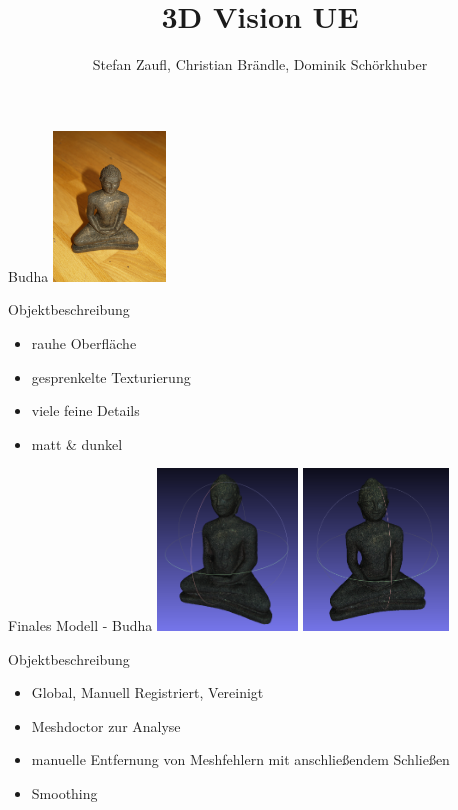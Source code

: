 \documentclass[11pt]{beamer}
\author{Stefan Zaufl, Christian Brändle, Dominik Schörkhuber}
\title{3D Vision UE}
\begin{document}
\begin{frame}
\titlepage
\end{frame}


\begin{frame}{Budha}
\center
	\includegraphics[width=3cm]{images/budha/Budha_original.jpg}
	\begin{block}{Objektbeschreibung}
		\begin{itemize}
			\item rauhe Oberfläche
			\item gesprenkelte Texturierung
			\item viele feine Details
			\item matt \& dunkel
		\end{itemize}
	\end{block}

\end{frame}

\begin{frame}{Finales Modell - Budha}
\center
	\includegraphics[height=4.3cm]{images/budha/Budha_3DScan_Untextured_2.png}
	\includegraphics[height=4.3cm]{images/budha/Budha_3DScan_Untextured.png}
	\begin{block}{Objektbeschreibung}
		\begin{itemize}
			\item Global, Manuell Registriert, Vereinigt
			\item Meshdoctor zur Analyse
			\item manuelle Entfernung von Meshfehlern mit anschließendem Schließen
			\item Smoothing
		\end{itemize}
	\end{block}
\end{frame}
\end{document}
